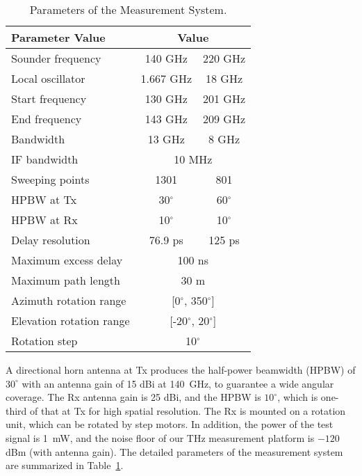 \documentclass[conference]{IEEEtran}
\begin{document}
\begin{table}[htbp]
  \centering
  \caption{Parameters of the Measurement System.}
    \begin{tabular}{|l|c|c|}
    \hline
    \textbf{Parameter Value} & \multicolumn{2}{c|}{\textbf{Value}} \\
    \hline
    Sounder frequency & 140 GHz & 220 GHz \\
    \hline
    Local oscillator & 1.667 GHz & 18 GHz \\
    \hline
    Start frequency & 130 GHz & 201 GHz \\
    \hline
    End frequency & 143 GHz & 209 GHz \\
    \hline
    Bandwidth & 13 GHz & 8 GHz \\
    \hline
    IF bandwidth & \multicolumn{2}{c||}{10 MHz} \\
    \hline
    Sweeping points & 1301  & 801 \\
    \hline
    HPBW at Tx & 30$^{\circ}$   & 60$^{\circ}$ \\
    \hline
    HPBW at Rx & 10$^{\circ}$   & 10$^{\circ}$ \\
    \hline
    Delay resolution & 76.9 ps & 125 ps \\
    \hline
    Maximum excess delay & \multicolumn{2}{c|}{100 ns} \\
    \hline
    Maximum path length & \multicolumn{2}{c|}{30 m} \\
    \hline
    Azimuth rotation range & \multicolumn{2}{c|}{[0$^{\circ}$, 350$^{\circ}$]} \\
    \hline
    Elevation rotation range & \multicolumn{2}{c|}{[-20$^{\circ}$, 20$^{\circ}$]} \\
    \hline
    Rotation step & \multicolumn{2}{c|}{10$^{\circ}$} \\
    \hline
    \end{tabular}%
  \label{tab:mparameters}%
\end{table}%


\par  A directional horn antenna at Tx produces the half-power beamwidth (HPBW) of $30^\circ$ with an antenna gain of 15 dBi at 140~GHz, to guarantee a wide angular coverage. The Rx antenna gain is 25 dBi, and the HPBW is $10^\circ$, which is one-third of that at Tx for high spatial resolution. The Rx is mounted on a rotation unit, which can be rotated by step motors. In addition, the power of the test signal is 1~mW, and the noise floor of our THz measurement platform is $-120$ dBm (with antenna gain). The detailed parameters of the measurement system are summarized in Table~\ref{tab:mparameters}.
\end{document}
